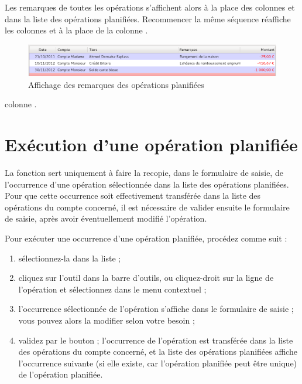 Les remarques de toutes les opérations s'affichent alors à la place des colonnes  et  dans la liste des opérations planifiées. Recommencer la même séquence réaffiche les colonnes  et  à la place de la \ifIllustration colonne .

\begin{figure}[htbp]
\begin{center}
\includegraphics[scale=0.5]{image/screenshot/planned_transactions_list_comments}
\end{center}
\caption{Affichage des remarques des opérations planifiées}
\label{planned-transactions-list-comments-img}
\end{figure}
\else colonne .
\fi

\ifIllustration
\fi


\section{Exécution d'une opération planifiée\label{plannedtransactions-execution}}


La fonction  sert uniquement à faire la recopie, dans le formulaire de saisie, de l'occurrence d'une opération sélectionnée dans la liste des opérations planifiées. Pour que cette occurrence soit effectivement transférée dans la liste des opérations du compte concerné, il est nécessaire de valider ensuite le formulaire de saisie, après avoir éventuellement modifié l'opération. 

Pour exécuter une occurrence d'une opération planifiée, procédez comme suit :

\begin{enumerate}
	 \item sélectionnez-la dans la liste ;
	 \item cliquez sur l'outil  dans la barre d'outils, ou cliquez-droit sur la ligne de l'opération et sélectionnez  dans le menu contextuel ;
	 \item l'occurrence sélectionnée de l'opération s'affiche dans le formulaire de saisie ; vous pouvez alors la modifier selon votre besoin ;
	 \item validez par le bouton  ; l'occurrence de l'opération est transférée dans la liste des opérations du compte concerné, et la liste des opérations planifiées affiche l'occurrence suivante (si elle existe, car l'opération planifiée peut être unique) de l'opération planifiée. 
\end{enumerate}


